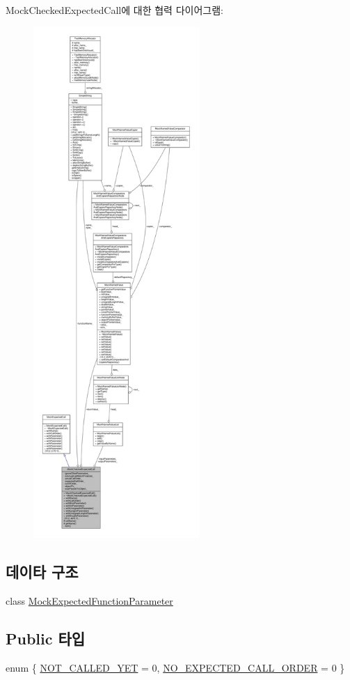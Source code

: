 Mock\+Checked\+Expected\+Call에 대한 협력 다이어그램\+:
\nopagebreak
\begin{figure}[H]
\begin{center}
\leavevmode
\includegraphics[height=550pt]{class_mock_checked_expected_call__coll__graph}
\end{center}
\end{figure}
\subsection*{데이타 구조}
\begin{DoxyCompactItemize}
\item 
class \hyperlink{class_mock_checked_expected_call_1_1_mock_expected_function_parameter}{Mock\+Expected\+Function\+Parameter}
\end{DoxyCompactItemize}
\subsection*{Public 타입}
\begin{DoxyCompactItemize}
\item 
enum \{ \hyperlink{class_mock_checked_expected_call_a25e50be5c73e0b2fab54944e68dd48c2a3ab9ca78a7007329301ba4cfb64310a7}{N\+O\+T\+\_\+\+C\+A\+L\+L\+E\+D\+\_\+\+Y\+ET} = 0, 
\hyperlink{class_mock_checked_expected_call_a25e50be5c73e0b2fab54944e68dd48c2a6ccc501af241824b9412a0a9e499a8cf}{N\+O\+\_\+\+E\+X\+P\+E\+C\+T\+E\+D\+\_\+\+C\+A\+L\+L\+\_\+\+O\+R\+D\+ER} = 0
 \}
\end{DoxyCompactItemize}
